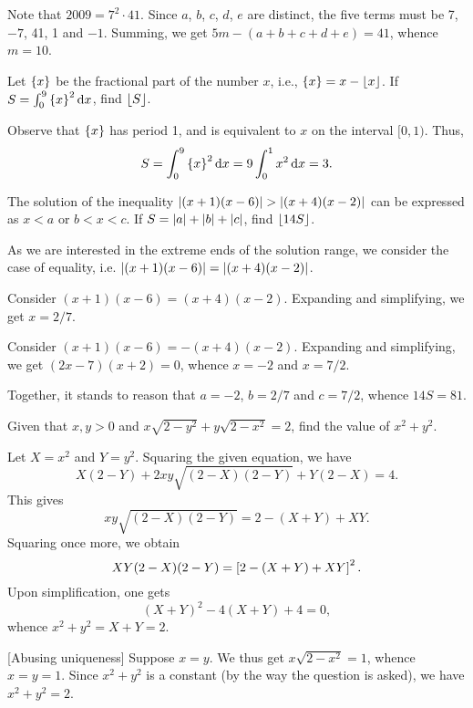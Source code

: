 Note that $2009 = 7^2 \cdot 41$. Since $a$, $b$, $c$, $d$, $e$ are distinct, the five terms must be 7, $-7$, 41, 1 and $-1$. Summing, we get $5m - (a + b + c + d + e) = 41$, whence $m = 10$.

\clearpage
\begin{question}[3]\label{A::2024-O-1-13}
    Let $\left\lbrace x \right\rbrace$ be the fractional part of the number $x$, i.e., $\left\lbrace x \right\rbrace = x - \left\lfloor x \right\rfloor$. If $S = \int_0^9 \left\lbrace x \right\rbrace^2 \mathop{\mathrm{d}x}$, find $\left\lfloor S \right\rfloor$.
\end{question}

Observe that $\left\lbrace x \right\rbrace$ has period 1, and is equivalent to $x$ on the interval $[0, 1)$. Thus, \[S = \int_0^9 \left\lbrace x \right\rbrace^2 \mathop{\mathrm{d}x} = 9 \int_0^1 x^2 \mathop{\mathrm{d}x} = 3.\]

\begin{question}[81]\label{A::2024-O-1-14}
    The solution of the inequality $\left\lvert (x+1)(x-6) \right\rvert > \left\lvert (x+4)(x-2) \right\rvert$ can be expressed as $x < a$ or $b < x < c$. If $S = \left\lvert a \right\rvert + \left\lvert b \right\rvert + \left\lvert c \right\rvert$, find $\left\lfloor 14S \right\rfloor$.
\end{question}

As we are interested in the extreme ends of the solution range, we consider the case of equality, i.e. $\left\lvert (x+1)(x-6) \right\rvert = \left\lvert (x+4)(x-2) \right\rvert$.

 Consider $(x+1)(x-6) = (x+4)(x-2)$. Expanding and simplifying, we get $x = 2/7$.

 Consider $(x+1)(x-6) = -(x+4)(x-2)$. Expanding and simplifying, we get $(2x-7)(x+2) = 0$, whence $x = -2$ and $x = 7/2$.

Together, it stands to reason that $a = -2$, $b = 2/7$ and $c = 7/2$, whence $14S = 81$.

\begin{question}[2]\label{A::2024-O-1-15}
    Given that $x, y > 0$ and $x\sqrt{2-y^2} + y\sqrt{2-x^2} = 2$, find the value of $x^2 + y^2$.
\end{question}

 Let $X = x^2$ and $Y = y^2$. Squaring the given equation, we have \[X(2-Y) + 2xy\sqrt{(2-X)(2-Y)} + Y(2-X) = 4.\] This gives \[xy\sqrt{(2-X)(2-Y)} = 2 - (X+Y) + XY.\]Squaring once more, we obtain \[XY(2-X)(2-Y) = \left[ 2 - (X+Y) + XY \right]^2.\] Upon simplification, one gets \[(X+Y)^2 - 4(X+Y) + 4 = 0,\] whence $x^2 + y^2 = X + Y = 2$.

[Abusing uniqueness] Suppose $x = y$. We thus get $x\sqrt{2- x^2} = 1$, whence $x = y = 1$. Since $x^2 + y^2$ is a constant (by the way the question is asked), we have $x^2 + y^2 = 2$.

